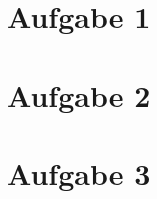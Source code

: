\documentclass[a4paper,
twoside,
headlines=2.1
]{scrartcl}
\author{\yourname}
\title{\lecture}
\subtitle{Übungsblatt \sheetnum \\ \group}
\date{\today}
\begin{document}
	
	\maketitle
	
	\section*{Aufgabe 1}
		
	\section*{Aufgabe 2}
		
	\section*{Aufgabe 3}
		
	
\end{document}

